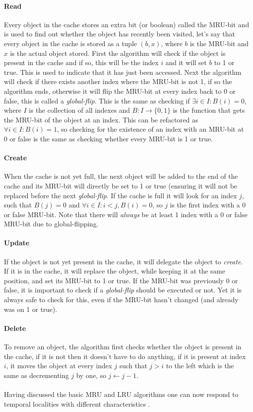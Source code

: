 \documentclass[pdftex,a4paper,12pt,twoside]{report}
\begin{document}
\paragraph{Read} Every object in the cache stores an extra bit (or boolean) called the MRU-bit and is used to find out whether the object has recently been visited, let's
say that every object in the cache is stored as a tuple $(b,x)$, where $b$ is the MRU-bit and $x$ is the actual object stored. First the algorithm will check if the object is present in the cache and if so, this will be the index $i$ and it will set $b$ to 1 or true. This is used to indicate that it has just been accessed. Next the algorithm will check if there exists another index where the MRU-bit is not 1, if so the algorithm ends, otherwise it will flip the MRU-bit at every index back to 0 or false, this is called a 
\emph{global-flip}. This is the same as checking if $\exists i \in I : B(i) = 0$, where $I$ is the collection of all indexes and $B : I \to \{0,1\}$ is the function that gets the MRU-bit of the object at an index. This can be refactored as $\forall i \in I : B(i) = 1$, so checking for the existence of an index with an MRU-bit at 0 or false is the same as checking whether every MRU-bit is 1 or true.
\paragraph{Create} When the cache is not yet full, the next object will be added to the end of the cache and its MRU-bit will directly be set to 1 or true (ensuring it will not 
be replaced before the next \emph{global-flip}. If the cache is full it will look for an index $j$, such that $B(j) = 0$ and $\forall i \in I : i < j, B(i) = 0$, so $j$ is the first index with a 0 or false MRU-bit. Note that there will \emph{always} be at least 1 index with a 0 or false MRU-bit due to global-flipping.
\paragraph{Update} If the object is not yet present in the cache, it will delegate the object to \emph{create}. If it is in the cache, it will replace the object, while keeping it at the same position, and set its MRU-bit to 1 or true. If the MRU-bit was previously 0 or false, it is important to check if a \emph{global-flip} should be executed or not. Yet it is always safe to check for this, even if the MRU-bit hasn't changed (and already was on 1 or true).
\paragraph{Delete} To remove an object, the algorithm first checks whether the object is present in the cache, if it is not then it doesn't have to do anything, if it is present at index $i$, it moves the object at every index $j$ such that $j > i$ to the left which is the same as decrementing $j$ by one, so $j \leftarrow j - 1$.
\\\\
Having discussed the basic MRU and LRU algorithms one can now respond to temporal localities with different characteristics \citep{guan2014wcet}.
\end{document}
